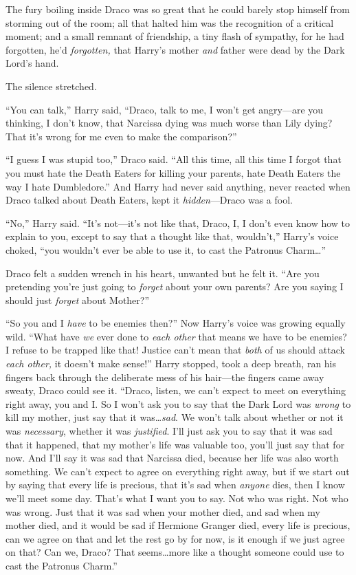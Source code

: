 \later

The fury boiling inside Draco was so great that he could barely stop himself from storming out of the room; all that halted him was the recognition of a critical moment; and a small remnant of friendship, a tiny flash of sympathy, for he had forgotten, he’d \emph{forgotten,} that Harry’s mother \emph{and} father were dead by the Dark Lord’s hand.

The silence stretched.

“You can talk,” Harry said, “Draco, talk to me, I won’t get angry—are you thinking, I don’t know, that Narcissa dying was much worse than Lily dying? That it’s wrong for me even to make the comparison?”

“I guess I was stupid too,” Draco said. “All this time, all this time I forgot that you must hate the Death Eaters for killing your parents, hate Death Eaters the way I hate Dumbledore.” And Harry had never said anything, never reacted when Draco talked about Death Eaters, kept it \emph{hidden}—Draco was a fool.

“No,” Harry said. “It’s not—it’s not like that, Draco, I, I don’t even know how to explain to you, except to say that a thought like that, wouldn’t,” Harry’s voice choked, “you wouldn’t ever be able to use it, to cast the Patronus Charm…”

Draco felt a sudden wrench in his heart, unwanted but he felt it. “Are you pretending you’re just going to \emph{forget} about your own parents? Are you saying I should just \emph{forget} about Mother?”

“So you and I \emph{have} to be enemies then?” Now Harry’s voice was growing equally wild. “What have \emph{we} ever done to \emph{each other} that means we have to be enemies? I refuse to be trapped like that! Justice can’t mean that \emph{both} of us should attack \emph{each other,} it doesn’t make sense!” Harry stopped, took a deep breath, ran his fingers back through the deliberate mess of his hair—the fingers came away sweaty, Draco could see it. “Draco, listen, we can’t expect to meet on everything right away, you and I\@. So I won’t ask you to say that the Dark Lord was \emph{wrong} to kill my mother, just say that it was…\emph{sad}. We won’t talk about whether or not it was \emph{necessary}, whether it was \emph{justified}. I’ll just ask you to say that it was sad that it happened, that my mother’s life was valuable too, you’ll just say that for now. And I’ll say it was sad that Narcissa died, because her life was also worth something. We can’t expect to agree on everything right away, but if we start out by saying that every life is precious, that it’s sad when \emph{anyone} dies, then I know we’ll meet some day. That’s what I want you to say. Not who was right. Not who was wrong. Just that it was sad when your mother died, and sad when my mother died, and it would be sad if Hermione Granger died, every life is precious, can we agree on that and let the rest go by for now, is it enough if we just agree on that? Can we, Draco? That seems…more like a thought someone could use to cast the Patronus Charm.”

